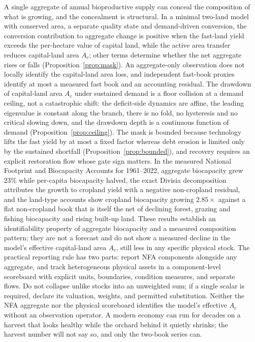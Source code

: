 \documentclass[preprint,12pt,authoryear]{elsarticle}
\begin{document}
A single aggregate of annual bioproductive supply can conceal the composition of what is growing, and the concealment is structural. In a minimal two-land model with conserved area, a separate quality state and demand-driven conversion, the conversion contribution to aggregate change is positive when the fast-land yield exceeds the per-hectare value of capital land, while the active area transfer reduces capital-land area $A_c$; other terms determine whether the net aggregate rises or falls (Proposition~\ref{prop:mask}). An aggregate-only observation does not locally identify the capital-land area loss, and independent fast-book proxies identify at most a measured fast book and an accounting residual. The drawdown of capital-land area $A_c$ under sustained demand is a floor collision at a demand ceiling, not a catastrophic shift: the deficit-side dynamics are affine, the leading eigenvalue is constant along the branch, there is no fold, no hysteresis and no critical slowing down, and the drawdown depth is a continuous function of demand (Proposition~\ref{prop:ceiling}). The mask is bounded because technology lifts the fast yield by at most a fixed factor whereas debt erosion is limited only by the sustained shortfall (Proposition~\ref{prop:bounded}), and recovery requires an explicit restoration flow whose gate sign matters. In the measured National Footprint and Biocapacity Accounts for 1961--2022, aggregate biocapacity grew $23\%$ while per-capita biocapacity halved, the exact Divisia decomposition attributes the growth to cropland yield with a negative non-cropland residual, and the land-type accounts show cropland biocapacity growing $2.85\times$ against a flat non-cropland book that is itself the net of declining forest, grazing and fishing biocapacity and rising built-up land. These results establish an identifiability property of aggregate biocapacity and a measured composition pattern; they are not a forecast and do not show a measured decline in the model's effective capital-land area $A_c$, still less in any specific physical stock. The practical reporting rule has two parts: report NFA components alongside any aggregate, and track heterogeneous physical assets in a component-level scoreboard with explicit units, boundaries, condition measures, and separate flows. Do not collapse unlike stocks into an unweighted sum; if a single scalar is required, declare its valuation, weights, and permitted substitution. Neither the NFA aggregate nor the physical scoreboard identifies the model's effective $A_c$ without an observation operator. A modern economy can run for decades on a harvest that looks healthy while the orchard behind it quietly shrinks; the harvest number will not say so, and only the two-book series can.
\end{document}
